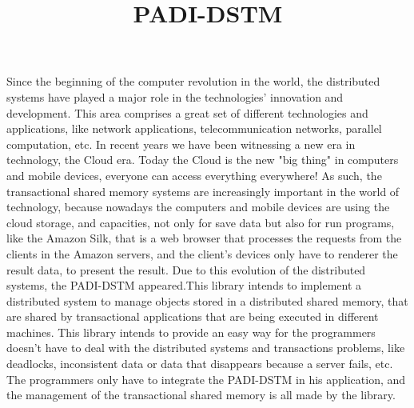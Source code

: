 \documentclass[times, 10pt,twocolumn]{article}
\begin{document}
\title{PADI-DSTM}



\maketitle
\thispagestyle{empty}


Since the beginning of the computer revolution in the world, the distributed systems have played a major role in the technologies' innovation and development. This area comprises a great set of different technologies and applications, like network applications, telecommunication networks, parallel computation, etc. In recent years we have been witnessing a new era in technology, the Cloud era. Today the Cloud is the new "big thing" in computers and mobile devices, everyone can access everything  everywhere! As such, the transactional shared memory systems are increasingly important in the world of technology, because nowadays the computers and mobile devices are using the cloud storage, and capacities, not only for save data but also for run programs, like the Amazon Silk, that is a web browser that processes the requests from the clients in the Amazon servers, and the client's devices only have to renderer the result data, to present the result. Due to this evolution of the distributed systems, the PADI-DSTM appeared.This library intends to implement a distributed system to manage objects stored in a distributed shared memory, that are shared by transactional applications that are being executed in different machines. This library intends to provide an easy way for the programmers doesn't have to deal with the distributed systems and transactions problems, like deadlocks, inconsistent data or data that disappears because a server fails, etc. The programmers only have to integrate the PADI-DSTM in his application, and the management of the transactional shared memory is all made by the library.

\end{document}
